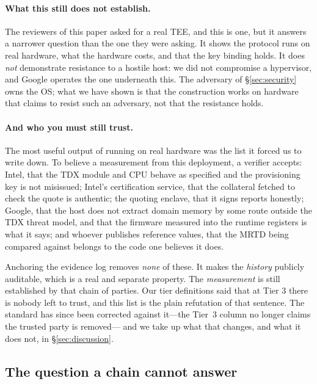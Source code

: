 \documentclass[11pt]{article}
\begin{document}
\paragraph{What this still does not establish.} The reviewers of this paper
asked for a real TEE, and this is one, but it answers a narrower question than
the one they were asking. It shows the protocol runs on real hardware, what the
hardware costs, and that the key binding holds. It does \emph{not} demonstrate
resistance to a hostile host: we did not compromise a hypervisor, and Google
operates the one underneath this. The adversary of \S\ref{sec:security} owns the
OS; what we have shown is that the construction works on hardware that claims to
resist such an adversary, not that the resistance holds.

\paragraph{And who you must still trust.} The most useful output of running on
real hardware was the list it forced us to write down. To believe a measurement
from this deployment, a verifier accepts: Intel, that the TDX module and CPU
behave as specified and the provisioning key is not misissued; Intel's
certification service, that the collateral fetched to check the quote is
authentic; the quoting enclave, that it signs reports honestly; Google, that the %
host does not extract domain memory by some route outside the TDX threat model,
and that the firmware measured into the runtime registers is what it says; %
and whoever publishes reference values, that the MRTD being compared against
belongs to the code one believes it does.

Anchoring the evidence log removes \emph{none} of these. It makes the
\emph{history} publicly auditable, which is a real and separate property. The
\emph{measurement} is still established by that chain of parties. Our tier
definitions said that at Tier 3 there is nobody left to trust, and this list is
the plain refutation of that sentence. The standard has since been corrected
against it---the Tier~3 column no longer claims the trusted party is removed---%
and we take up what that changes, and what it does not, in
\S\ref{sec:discussion}.

\subsection{The question a chain cannot answer}
\label{sec:merkle}
\end{document}
